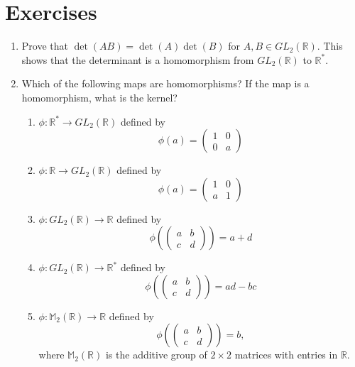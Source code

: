  
\section*{Exercises}
\exrule
 
 
 
{\small
 
 
\begin{enumerate}
 
 
 
\item
Prove that $\det( AB) = \det(A) \det(B)$ for $A, B \in GL_2( {\mathbb R}
)$. This shows that the determinant is a homomorphism from $GL_2(
{\mathbb R} )$ to ${\mathbb R}^*$. 
 
 
 
\item
Which of the following maps are homomorphisms? If the map is a
homomorphism, what is the kernel? 
\begin{enumerate}
 
 \item
$\phi : {\mathbb R}^\ast \rightarrow GL_2 ( {\mathbb R})$ defined by
\[
\phi( a ) =
\begin{pmatrix}
1 & 0 \\
0 & a
\end{pmatrix}
\]
 
 \item
$\phi : {\mathbb R} \rightarrow GL_2 ( {\mathbb R})$ defined by
\[
\phi( a ) =
\begin{pmatrix}
1 & 0 \\
a & 1
\end{pmatrix}
\]
 
 \item
$\phi : GL_2 ({\mathbb R})   \rightarrow {\mathbb R}$ defined by
\[
\phi
\left(
\begin{pmatrix}
a & b \\
c & d
\end{pmatrix}
\right)
= a + d
\]
 
 \item
$\phi : GL_2 ( {\mathbb R})   \rightarrow {\mathbb R}^\ast$ defined by 
\[
\phi
\left(
\begin{pmatrix}
a & b \\
c & d
\end{pmatrix}
\right)
= ad -bc
\]
 
 \item
$\phi : {\mathbb M}_2( {\mathbb R})   \rightarrow {\mathbb R}$ defined by
\[
\phi
\left(
\begin{pmatrix}
a & b \\
c & d
\end{pmatrix}
\right)
= b,
\]
where ${\mathbb M}_2( {\mathbb R})$ is the additive group of $2 \times 2$ matrices with entries in ${\mathbb R}$.
 

\end{enumerate}
\end{enumerate}}
